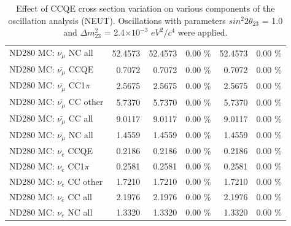 \begin{table}
\begin{tabular}{| l | r | r  r | r  r |}
                                          ND280 MC: $\nu_{\mu}$ NC all &         52.4573 &         52.4573 &  0.00 \%  &         52.4573 &  0.00 \%  \\ 
                                      ND280 MC: $\bar{\nu_{\mu}}$ CCQE &          0.7072 &          0.7072 &  0.00 \%  &          0.7072 &  0.00 \%  \\ 
                                  ND280 MC: $\bar{\nu_{\mu}}$ CC1$\pi$ &          2.5675 &          2.5675 &  0.00 \%  &          2.5675 &  0.00 \%  \\ 
                                  ND280 MC: $\bar{\nu_{\mu}}$ CC other &          5.7370 &          5.7370 &  0.00 \%  &          5.7370 &  0.00 \%  \\ 
                                    ND280 MC: $\bar{\nu_{\mu}}$ CC all &          9.0117 &          9.0117 &  0.00 \%  &          9.0117 &  0.00 \%  \\ 
                                    ND280 MC: $\bar{\nu_{\mu}}$ NC all &          1.4559 &          1.4559 &  0.00 \%  &          1.4559 &  0.00 \%  \\ 
                                              ND280 MC: $\nu_{e}$ CCQE &          0.2186 &          0.2186 &  0.00 \%  &          0.2186 &  0.00 \%  \\ 
                                          ND280 MC: $\nu_{e}$ CC1$\pi$ &          0.2581 &          0.2581 &  0.00 \%  &          0.2581 &  0.00 \%  \\ 
                                          ND280 MC: $\nu_{e}$ CC other &          1.7210 &          1.7210 &  0.00 \%  &          1.7210 &  0.00 \%  \\ 
                                            ND280 MC: $\nu_{e}$ CC all &          2.1976 &          2.1976 &  0.00 \%  &          2.1976 &  0.00 \%  \\ 
                                            ND280 MC: $\nu_{e}$ NC all &          1.3320 &          1.3320 &  0.00 \%  &          1.3320 &  0.00 \%  \\ 
\hline
\end{tabular}
\caption{ 
  Effect of CCQE cross section variation
  on various components of the oscillation analysis (NEUT).
  Oscillations with parameters $sin^{2}2\theta_{23}$ = 1.0 and $\Delta m^{2}_{23}$ = 2.4$\times10^{-3}$ $eV^{2}/c^{4}$ were applied.  
}
\label{tab:neut_xsec_ccqe}
\end{table}


%
%
%
%

